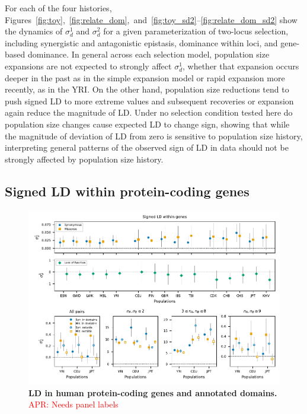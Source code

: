 \documentclass[]{article}
\newcommand{\comment}[1]{{\textcolor{red}{APR: #1}}}
\begin{document}
For each of the four histories,
Figures~\ref{fig:toy},~\ref{fig:relate_dom},~and~\ref{fig:toy_sd2}--\ref{fig:relate_dom_sd2}
show the dynamics of \(\sigma_d^1\) and \(\sigma_d^2\) for a given
parameterization of two-locus selection, including synergistic and antagonistic
epistasis, dominance within loci, and gene-based dominance. In general across
each selection model, population size expansions are not expected to strongly
affect \(\sigma_d^1\), whether that expansion occurs deeper in the past as in
the simple expansion model or rapid expansion more recently, as in the YRI. On
the other hand, population size reductions tend to push signed LD to more
extreme values and subsequent recoveries or expansion again reduce the
magnitude of LD. Under no selection condition tested here do population size
changes cause expected LD to change sign, showing that while the magnitude of
deviation of LD from zero is sensitive to population size history, interpreting
general patterns of the observed sign of LD in data should not be strongly
affected by population size history.

\subsection{Signed LD within protein-coding genes}

\begin{figure}[tb!]
    \centering
    \includegraphics{../figures/data_compact}
    \caption{
        \textbf{LD in human protein-coding genes and annotated domains.}
        \comment{Needs panel labels}
    }
    \label{fig:data}
\end{figure}
\end{document}
